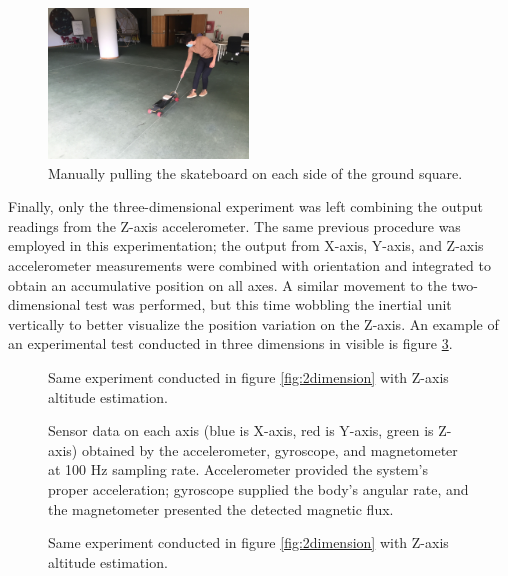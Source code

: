 \begin{figure}[!h]
    \centering
    \includegraphics[width=0.475\textwidth]{figures/experiment.jpg}
    \caption{ Manually pulling the skateboard on each side of the ground square. }
    \label{fig:full}
\end{figure}

Finally, only the three-dimensional experiment was left combining the output readings from the Z-axis accelerometer. The same previous procedure was employed in this experimentation; the output from X-axis, Y-axis, and Z-axis accelerometer measurements were combined with orientation and integrated to obtain an accumulative position on all axes. A similar movement to the two-dimensional test was performed, but this time wobbling the inertial unit vertically to better visualize the position variation on the Z-axis. An example of an experimental test conducted in three dimensions in visible is figure \ref{fig:3dimensions}.

\begin{figure}[!h]
    
    \caption{Same experiment conducted in figure \ref{fig:2dimension}  with Z-axis altitude estimation. }
    \label{fig:3dimensions}
\end{figure}

\begin{figure}
    \centering
    \resizebox{1\linewidth}{!}{}
    \caption{Sensor data on each axis (blue is X-axis, red is Y-axis, green is Z-axis) obtained by the accelerometer, gyroscope, and magnetometer at 100 Hz sampling rate. Accelerometer provided the system’s proper acceleration; gyroscope supplied the body’s angular rate, and the magnetometer presented the detected magnetic flux.}
\end{figure}

\begin{figure}[!h]
    
    \caption{Same experiment conducted in figure \ref{fig:2dimension}  with Z-axis altitude estimation. }
    \label{fig:3dimensions}
\end{figure}

